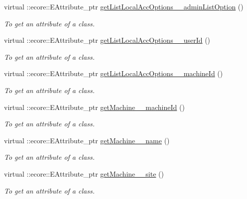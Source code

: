 \begin{DoxyCompactItemize}
virtual ::ecore::EAttribute\_\-ptr \hyperlink{classUMS__Data_1_1UMS__DataPackage_a47d74b4f3c99a8075091919e7e410a32}{getListLocalAccOptions\_\-\_\-adminListOption} ()
\begin{DoxyCompactList}\small\item\em To get an attribute of a class. \item\end{DoxyCompactList}\item 
virtual ::ecore::EAttribute\_\-ptr \hyperlink{classUMS__Data_1_1UMS__DataPackage_ab45a33e7be7ecffdd4ae7ec65470ecb8}{getListLocalAccOptions\_\-\_\-userId} ()
\begin{DoxyCompactList}\small\item\em To get an attribute of a class. \item\end{DoxyCompactList}\item 
virtual ::ecore::EAttribute\_\-ptr \hyperlink{classUMS__Data_1_1UMS__DataPackage_a52f88e369fa776ba701511d179a83a40}{getListLocalAccOptions\_\-\_\-machineId} ()
\begin{DoxyCompactList}\small\item\em To get an attribute of a class. \item\end{DoxyCompactList}\item 
virtual ::ecore::EAttribute\_\-ptr \hyperlink{classUMS__Data_1_1UMS__DataPackage_a9e396c5fdf89297a054326caca30260c}{getMachine\_\-\_\-machineId} ()
\begin{DoxyCompactList}\small\item\em To get an attribute of a class. \item\end{DoxyCompactList}\item 
virtual ::ecore::EAttribute\_\-ptr \hyperlink{classUMS__Data_1_1UMS__DataPackage_af2430dbfe02d614bb56edd2afd80060e}{getMachine\_\-\_\-name} ()
\begin{DoxyCompactList}\small\item\em To get an attribute of a class. \item\end{DoxyCompactList}\item 
virtual ::ecore::EAttribute\_\-ptr \hyperlink{classUMS__Data_1_1UMS__DataPackage_a452ab05cca22483a1dbf5fe70759809f}{getMachine\_\-\_\-site} ()
\begin{DoxyCompactList}\small\item\em To get an attribute of a class. \item\end{DoxyCompactList}\item 

\end{DoxyCompactItemize}

